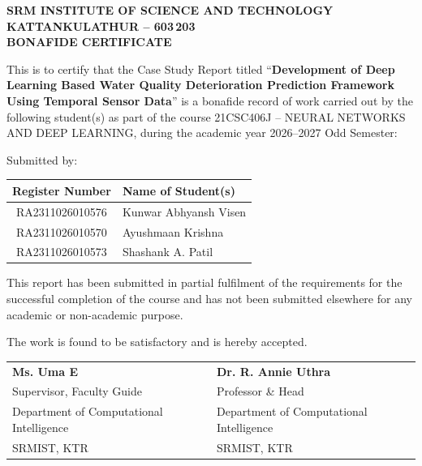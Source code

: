 \documentclass[12pt,a4paper]{report}
\numberwithin{table}{chapter}
\numberwithin{figure}{chapter}
\begin{document}
\newpage
\thispagestyle{plain}
\begin{center}
{\fontsize{18}{22}\selectfont\bfseries SRM INSTITUTE OF SCIENCE AND TECHNOLOGY\\
KATTANKULATHUR -- 603\,203\\[0.6cm]}
{\fontsize{16}{20}\selectfont\bfseries BONAFIDE CERTIFICATE\\[0.4cm]}
\end{center}

\noindent This is to certify that the Case Study Report titled ``\textbf{Development of Deep Learning Based Water Quality Deterioration Prediction Framework Using Temporal Sensor Data}'' is a bonafide record of work carried out by the following student(s) as part of the course 21CSC406J -- NEURAL NETWORKS AND DEEP LEARNING, during the academic year 2026--2027 Odd Semester:

\vspace{0.3cm}
\noindent Submitted by:

\begin{center}
\renewcommand{\arraystretch}{1.25}
\begin{tabular}{|c|l|}
\hline
\textbf{Register Number} & \textbf{Name of Student(s)} \\
\hline
RA2311026010576 & Kunwar Abhyansh Visen \\
\hline
RA2311026010570 & Ayushmaan Krishna \\
\hline
RA2311026010573 & Shashank A. Patil \\
\hline
\end{tabular}
\end{center}

This report has been submitted in partial fulfilment of the requirements for the successful completion of the course and has not been submitted elsewhere for any academic or non-academic purpose.

The work is found to be satisfactory and is hereby accepted.

\vspace{0.8cm}
\noindent\begin{tabular}{@{}p{7cm} @{}p{7cm}}
\textbf{Ms. Uma E} & \textbf{Dr. R. Annie Uthra} \\
Supervisor, Faculty Guide & Professor \& Head \\
Department of Computational Intelligence & Department of Computational Intelligence \\
SRMIST, KTR & SRMIST, KTR \\
\end{tabular}
\end{document}
